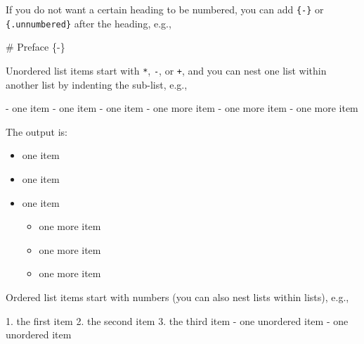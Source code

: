 \documentclass[
]{book}
\newenvironment{Shaded}{\begin{snugshade}}{\end{snugshade}}
\newcommand{\FunctionTok}[1]{\textcolor[rgb]{0.00,0.00,0.00}{#1}}
\newcommand{\NormalTok}[1]{#1}
\newcommand{\SpecialStringTok}[1]{\textcolor[rgb]{0.31,0.60,0.02}{#1}}
\providecommand{\tightlist}{%
  \setlength{\itemsep}{0pt}\setlength{\parskip}{0pt}}
\begin{document}
If you do not want a certain heading to be numbered, you can add \texttt{\{-\}}
or \texttt{\{.unnumbered\}} after the heading, e.g.,

\begin{Shaded}
\begin{Highlighting}[]
\FunctionTok{\# Preface \{{-}\}}
\end{Highlighting}
\end{Shaded}

Unordered list items start with \texttt{*}, \texttt{-}, or \texttt{+}, and you can nest one
list within another list by indenting the sub-list, e.g.,

\begin{Shaded}
\begin{Highlighting}[]
\SpecialStringTok{{-} }\NormalTok{one item}
\SpecialStringTok{{-} }\NormalTok{one item}
\SpecialStringTok{{-} }\NormalTok{one item}
\SpecialStringTok{    {-} }\NormalTok{one more item}
\SpecialStringTok{    {-} }\NormalTok{one more item}
\SpecialStringTok{    {-} }\NormalTok{one more item}
\end{Highlighting}
\end{Shaded}

The output is:

\begin{itemize}
\item
  one item
\item
  one item
\item
  one item

  \begin{itemize}
  \tightlist
  \item
    one more item
  \item
    one more item
  \item
    one more item
  \end{itemize}
\end{itemize}

Ordered list items start with numbers (you can also nest lists within
lists), e.g.,

\begin{Shaded}
\begin{Highlighting}[]
\SpecialStringTok{1. }\NormalTok{the first item}
\SpecialStringTok{2. }\NormalTok{the second item}
\SpecialStringTok{3. }\NormalTok{the third item}
\SpecialStringTok{    {-} }\NormalTok{one unordered item}
\SpecialStringTok{    {-} }\NormalTok{one unordered item}
\end{Highlighting}
\end{Shaded}
\end{document}
